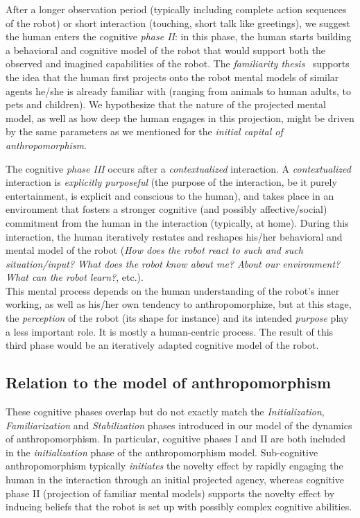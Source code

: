 \documentclass{sig-alternate-2013}
\begin{document}
After a longer observation period (typically including complete action sequences
of the robot) or short interaction (touching, short talk like greetings), we
suggest the human enters the cognitive \emph{phase II}: in this phase, the human
starts building a behavioral and cognitive model of the robot that would support
both the observed and imagined capabilities of the robot.  The \emph{familiarity
thesis}~\cite{hegel_understanding_2008} supports the idea that the human
first projects onto the robot mental models of similar agents he/she is already
familiar with (ranging from animals to human adults, to pets and children). We 
hypothesize that the nature of the projected mental
model, as well as how deep the human engages in this projection, might be
driven by the same parameters as we mentioned for the \emph{initial capital of
anthropomorphism}.

The cognitive \emph{phase III} occurs after a \emph{contextualized} interaction.
A \emph{contextualized} interaction is \emph{explicitly purposeful} (the purpose
of the interaction, be it purely entertainment, is explicit and conscious to the
human), and takes place in an environment that fosters a stronger cognitive (and
possibly affective/social) commitment from the human in the interaction
(typically, at home). During this interaction, the human iteratively restates
and reshapes his/her behavioral and mental model of the robot (\emph{How does
the robot react to such and such situation/input?  What does the robot know
about me? About our environment? What can the robot learn?}, etc.).\\

This mental process depends on the human understanding of the robot's
inner working, as well as his/her own tendency to anthropomorphize, but at this
stage, the \emph{perception} of the robot (its shape for instance) and its
intended \emph{purpose} play a less important role. It is mostly a human-centric
process.  The result of this third phase would be an iteratively adapted
cognitive model of the robot.

\subsection*{Relation to the model of anthropomorphism}

These cognitive phases overlap but do not exactly match the
\emph{Initialization}, \emph{Familiarization} and \emph{Stabilization} phases
introduced in our model of the dynamics of anthropomorphism. In particular,
cognitive phases I and II are both included in the \emph{initialization} phase
of the anthropomorphism model. Sub-cognitive anthropomorphism typically
\emph{initiates} the novelty effect by rapidly engaging the human in the
interaction through an initial projected agency, whereas cognitive phase II
(projection of familiar mental models) supports the novelty effect by inducing
beliefs that the robot is set up with possibly complex cognitive abilities.
\end{document}
